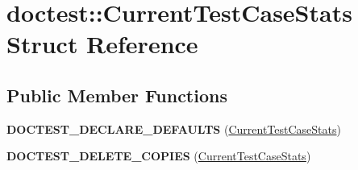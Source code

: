 \hypertarget{structdoctest_1_1_current_test_case_stats}{}\section{doctest\+::Current\+Test\+Case\+Stats Struct Reference}
\label{structdoctest_1_1_current_test_case_stats}
\subsection*{Public Member Functions}
\begin{DoxyCompactItemize}
\item 
\mbox{\label{structdoctest_1_1_current_test_case_stats_a4d2e7b147ad7e0c710059657e55b4917}} 
{\bfseries D\+O\+C\+T\+E\+S\+T\+\_\+\+D\+E\+C\+L\+A\+R\+E\+\_\+\+D\+E\+F\+A\+U\+L\+TS} (\mbox{\hyperlink{structdoctest_1_1_current_test_case_stats}{Current\+Test\+Case\+Stats}})
\item 
\mbox{\label{structdoctest_1_1_current_test_case_stats_a73d5100a3cdca7a03827765d9254a095}} 
{\bfseries D\+O\+C\+T\+E\+S\+T\+\_\+\+D\+E\+L\+E\+T\+E\+\_\+\+C\+O\+P\+I\+ES} (\mbox{\hyperlink{structdoctest_1_1_current_test_case_stats}{Current\+Test\+Case\+Stats}})
\end{DoxyCompactItemize}
